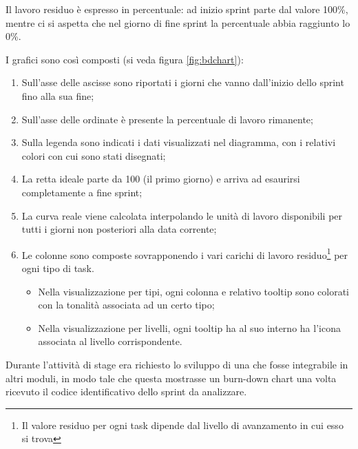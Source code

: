 Il lavoro residuo è espresso in percentuale: ad inizio sprint parte dal
valore 100\%, mentre ci si aspetta che nel giorno di fine sprint la
percentuale abbia raggiunto lo 0\%.

I grafici sono così composti (si veda figura \ref{fig:bdchart}):

\begin{enumerate}
\item Sull'asse delle ascisse sono riportati i giorni che vanno dall'inizio
  dello sprint fino alla sua fine;
\item Sull'asse delle ordinate è presente la percentuale di lavoro rimanente;
\item Sulla legenda sono indicati i dati visualizzati nel diagramma, con i
  relativi colori con cui sono stati disegnati;
\item La retta ideale parte da 100 (il primo giorno) e arriva ad esaurirsi
  completamente a fine sprint;
\item La curva reale viene calcolata interpolando le unità di lavoro
  disponibili per tutti i giorni non posteriori alla data corrente;
\item Le colonne sono composte sovrapponendo i vari carichi di lavoro
  residuo\footnote{Il valore residuo per ogni task dipende dal livello di
  avanzamento in cui esso si trova} per ogni tipo di task.
  \begin{itemize}
  \item Nella visualizzazione per tipi, ogni colonna e relativo tooltip sono
    colorati con la tonalità associata ad un certo tipo;
  \item Nella visualizzazione per livelli, ogni tooltip ha al suo interno ha
    l'icona associata al livello corrispondente.
  \end{itemize}
\end{enumerate}

Durante l'attività di stage era richiesto lo sviluppo di una 
che fosse integrabile in altri moduli, in modo tale che questa mostrasse un
burn-down chart una volta ricevuto il codice identificativo dello sprint da
analizzare.

